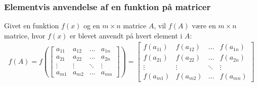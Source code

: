 \documentclass{article}
\begin{document}
\subsubsection{Elementvis anvendelse af en funktion på matricer}
Givet en funktion $f(x)$ og en $m \times n$ matrice $A$, vil $f(A)$ være en $m \times n$ matrice, hvor $f(x)$ er blevet anvendt på hvert element i $A$:
\begin{align}
  f(A) = f \left( \begin{bmatrix}
    a_{11} & a_{12} & \ldots & a_{1n} \\
    a_{21} & a_{22} & \ldots & a_{2n} \\
    \vdots & \vdots & \ddots & \vdots \\
    a_{m1} & a_{m2} & \ldots & a_{mn}
  \end{bmatrix} \right) = \begin{bmatrix}
    f(a_{11}) & f(a_{12}) & \ldots & f(a_{1n}) \\
    f(a_{21}) & f(a_{22}) & \ldots & f(a_{2n}) \\
    \vdots & \vdots & \ddots & \vdots \\
    f(a_{m1}) & f(a_{m2}) & \ldots & f(a_{mn})
  \end{bmatrix}
\end{align} 
\end{document}
